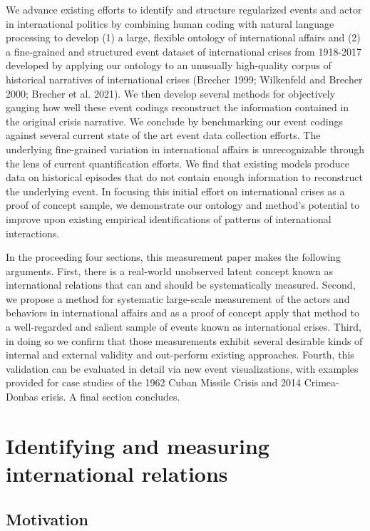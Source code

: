 \documentclass{article}
\begin{document}
We advance existing efforts to identify and structure regularized events
and actor in international politics by combining human coding with
natural language processing to develop (1) a large, flexible ontology of
international affairs and (2) a fine-grained and structured event
dataset of international crises from 1918-2017 developed by applying our
ontology to an unusually high-quality corpus of historical narratives of
international crises (Brecher 1999; Wilkenfeld and Brecher 2000; Brecher
et al. 2021). We then develop several methods for objectively gauging
how well these event codings reconstruct the information contained in
the original crisis narrative. We conclude by benchmarking our event
codings against several current state of the art event data collection
efforts. The underlying fine-grained variation in international affairs
is unrecognizable through the lens of current quantification efforts. We
find that existing models produce data on historical episodes that do
not contain enough information to reconstruct the underlying event. In
focusing this initial effort on international crises as a proof of
concept sample, we demonstrate our ontology and method's potential to
improve upon existing empirical identifications of patterns of
international interactions.

In the proceeding four sections, this measurement paper makes the
following arguments. First, there is a real-world unobserved latent
concept known as international relations that can and should be
systematically measured. Second, we propose a method for systematic
large-scale measurement of the actors and behaviors in international
affairs and as a proof of concept apply that method to a well-regarded
and salient sample of events known as international crises. Third, in
doing so we confirm that those measurements exhibit several desirable
kinds of internal and external validity and out-perform existing
approaches. Fourth, this validation can be evaluated in detail via new
event visualizations, with examples provided for case studies of the
1962 Cuban Missile Crisis and 2014 Crimea-Donbas crisis. A final section
concludes.

\hypertarget{identifying-and-measuring-international-relations}{%
\section{Identifying and measuring international
relations}\label{identifying-and-measuring-international-relations}}

\hypertarget{motivation}{%
\subsection{Motivation}\label{motivation}}
\end{document}
